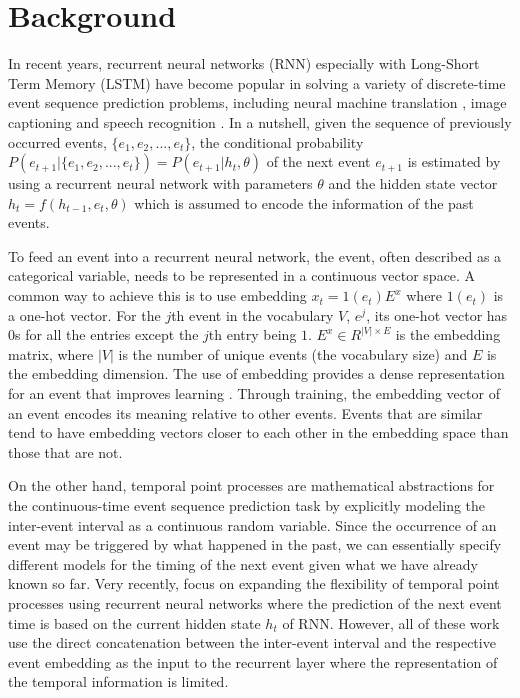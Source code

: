 \documentclass{article} %
\newcommand*{\prob}{\mathsf{\textit{P}}}
\begin{document}
\section{Background}
In recent years, recurrent neural networks (RNN) especially with Long-Short Term Memory (LSTM) \citep{Hochreiter:1997:LSM:1246443.1246450} have become popular in solving a variety of discrete-time event sequence prediction problems, including neural machine translation \citep{DBLP:journals/corr/BahdanauCB14}, image captioning \citep{DBLP:journals/corr/XuBKCCSZB15} and speech recognition \citep{DBLP:journals/corr/SoltauLS16}. In a nutshell, given the sequence of previously occurred events, $\{e_1, e_2, ..., e_{t}\}$, the conditional probability $\prob(e_{t+1}|\{e_1, e_2, ..., e_{t}\})=\prob(e_{t+1}|h_{t},\theta)$ of the next event $e_{t+1}$ is estimated by using a recurrent neural network with parameters $\theta$ and the hidden state vector $h_{t}=f(h_{t-1},e_{t},\theta)$ which is assumed to encode the information of the past events. 

To feed an event into a recurrent neural network, the event, often described as a categorical variable, needs to be represented in a continuous vector space. A common way to achieve this is to use embedding \citep{Bengio:2003:NPL:944919.944966} $x_t=1(e_t)E^x$ where $1(e_t)$ is a one-hot vector. For the $j$th event in the vocabulary $V$, $e^j$, its one-hot vector has $0$s for all the entries except the $j$th entry being $1$. $E^x\in{R^{|V|\times{E}}}$ is the embedding matrix, where $|V|$ is the number of unique events (the vocabulary size) and $E$ is the embedding dimension. The use of embedding provides a dense representation for an event that improves learning \citep{Turian:2010:WRS:1858681.1858721}. Through training, the embedding vector of an event encodes its meaning relative to other events. Events that are similar tend to have embedding vectors closer to each other in the embedding space than those that are not.

On the other hand, temporal point processes are mathematical abstractions for the continuous-time event sequence prediction task by explicitly modeling the inter-event interval as a continuous random variable. Since the occurrence of an event may be triggered by what happened in the past, we can essentially specify different models for the timing of the next event given what we have already known so far. Very recently, \citep{DuDaiTri16, MeiEis17, XiaYan17, XiaYanFar17} focus on expanding the flexibility of temporal point processes using recurrent neural networks where the prediction of the next event time is based on the current hidden state $h_{t}$ of RNN. However, all of these work use the direct concatenation between the inter-event interval and the respective event embedding as the input to the recurrent layer where the representation of the temporal information is limited. 
\end{document}
